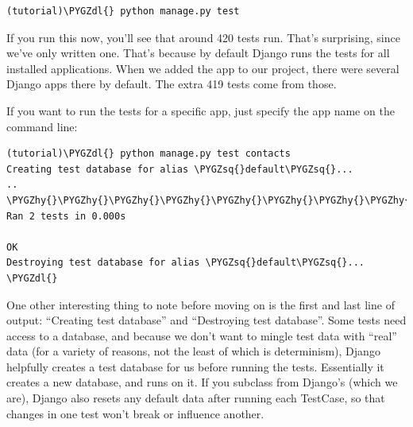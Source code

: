 \documentclass[letterpaper,10pt,english]{sphinxmanual}
\def\PYGZdl{\char`\$}
\def\PYGZhy{\char`\-}
\def\PYGZsq{\char`\'}
\renewcommand\PYGZsq{\textquotesingle}
\begin{document}
\begin{Verbatim}[commandchars=\\\{\}]
(tutorial)\PYGZdl{} python manage.py test
\end{Verbatim}

If you run this now, you'll see that around 420 tests run. That's
surprising, since we've only written one. That's because by default
Django runs the tests for all installed applications. When we added
the  app to our project, there were several Django apps
there by default. The extra 419 tests come from those.

If you want to run the tests for a specific app, just specify the app
name on the command line:

\begin{Verbatim}[commandchars=\\\{\}]
(tutorial)\PYGZdl{} python manage.py test contacts
Creating test database for alias \PYGZsq{}default\PYGZsq{}...
..
\PYGZhy{}\PYGZhy{}\PYGZhy{}\PYGZhy{}\PYGZhy{}\PYGZhy{}\PYGZhy{}\PYGZhy{}\PYGZhy{}\PYGZhy{}\PYGZhy{}\PYGZhy{}\PYGZhy{}\PYGZhy{}\PYGZhy{}\PYGZhy{}\PYGZhy{}\PYGZhy{}\PYGZhy{}\PYGZhy{}\PYGZhy{}\PYGZhy{}\PYGZhy{}\PYGZhy{}\PYGZhy{}\PYGZhy{}\PYGZhy{}\PYGZhy{}\PYGZhy{}\PYGZhy{}\PYGZhy{}\PYGZhy{}\PYGZhy{}\PYGZhy{}\PYGZhy{}\PYGZhy{}\PYGZhy{}\PYGZhy{}\PYGZhy{}\PYGZhy{}\PYGZhy{}\PYGZhy{}\PYGZhy{}\PYGZhy{}\PYGZhy{}\PYGZhy{}\PYGZhy{}\PYGZhy{}\PYGZhy{}\PYGZhy{}\PYGZhy{}\PYGZhy{}\PYGZhy{}\PYGZhy{}\PYGZhy{}\PYGZhy{}\PYGZhy{}\PYGZhy{}\PYGZhy{}\PYGZhy{}\PYGZhy{}\PYGZhy{}\PYGZhy{}\PYGZhy{}\PYGZhy{}\PYGZhy{}\PYGZhy{}\PYGZhy{}\PYGZhy{}\PYGZhy{}
Ran 2 tests in 0.000s

OK
Destroying test database for alias \PYGZsq{}default\PYGZsq{}...
\PYGZdl{}
\end{Verbatim}

One other interesting thing to note before moving on is the first and
last line of output: ``Creating test database'' and ``Destroying test
database''. Some tests need access to a database, and because we don't
want to mingle test data with ``real'' data (for a variety of reasons,
not the least of which is determinism), Django helpfully creates a
test database for us before running the tests. Essentially it creates
a new database, and runs  on it. If you subclass from
Django's  (which we are), Django also resets any default
data after running each TestCase, so that changes in one test won't
break or influence another.
\end{document}

